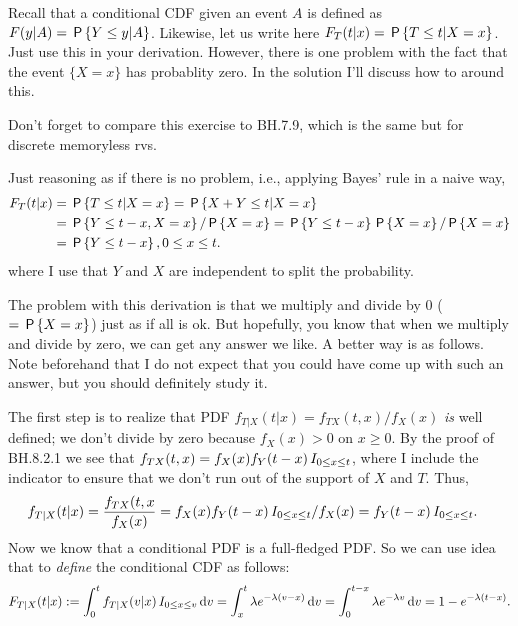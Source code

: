 \setcounter{theorem}{9}
\begin{exercise}[BH.7.10]

Recall that a conditional CDF given an event $A$ is defined as $F(y|A) = \P{Y\leq y|A}$. Likewise, let us write here $F_T(t|x) = \P{T\leq t|X=x}$.
Just use this in your derivation. However, there is one problem with the fact that the event $\{X=x\}$ has probablity zero. In the solution I'll discuss how to around this.

Don't forget to compare  this exercise to BH.7.9, which is the same but for discrete memoryless rvs.

\begin{solution}
Just reasoning as if there is no problem, i.e., applying Bayes' rule in a  naive way,
\begin{align*}
F_T(t|x) &= \P{T\leq t|X=x} = \P{X+Y\leq t|X=x} \\
  &=\P{Y\leq t-x, X=x}/\P{X=x} = \P{Y\leq t-x}\P{X=x}/\P{X=x}\\
  &=\P{Y\leq t-x}, 0\leq x \leq t.
\end{align*}
where I use that $Y$ and $X$ are independent to split the probability.

The problem with this derivation is that we multiply and divide by 0 ($=\P{X=x}$) just as if all is ok. But hopefully, you know that when we multiply and divide by zero, we can get any answer we like. A better way is as follows. Note beforehand that I do not expect that you could have  come up with such an answer, but you should definitely study it.


The first step is to realize that PDF $f_{T|X}(t|x)=f_{TX}(t,x)/f_X(x)$ \emph{is} well defined; we don't divide by zero because $f_{X}(x)>0$ on $x\geq 0$. By the proof of BH.8.2.1 we see that $f_{TX}(t,x) = f_X(x)f_Y(t-x) \1{0 \leq x \leq t}$, where I include the indicator to ensure that we don't run out of the support of $X$ and $T$. Thus,
\begin{align*}
  f_{T|X}(t|x) &= \frac{f_{TX}(t,x}{f_{X}(x)} = f_X(x)f_Y(t-x) \1{0 \leq x \leq t}/f_X(x) = f_Y(t-x)\1{0\leq x \leq t}.
\end{align*}
Now we know that a conditional PDF is a full-fledged PDF. So we can use idea that to \emph{define} the conditional CDF as follows:
\begin{align*}
F_{T|X}(t|x)
  := \int_0^t f_{T|X}(v|x)\1{0\leq x \leq v} \d v
    = \int_x^t \lambda e^{-\lambda(v-x)} \d v
    = \int_0^{t-x} \lambda e^{-\lambda v} \d v = 1- e^{-\lambda(t-x)}.
\end{align*}


\end{solution}
\end{exercise}
